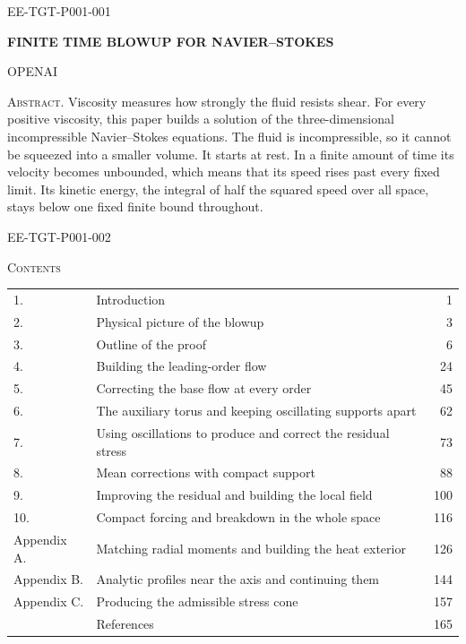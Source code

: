 %
\begin{EESegment}{EE-TGT-P001-001}
\begin{center}
  {\Large\bfseries FINITE TIME BLOWUP FOR NAVIER--STOKES\par}
  \vspace{2.5em}
  {\large OPENAI\par}
\end{center}

\vspace{2em}
\noindent\textsc{Abstract.} Viscosity measures how strongly the fluid resists shear. For every
positive viscosity, this paper builds a solution of the three-dimensional incompressible
Navier--Stokes equations. The fluid is incompressible, so
it cannot be squeezed into a smaller volume. It starts at rest. In a finite amount of time its
velocity becomes unbounded, which means that its speed rises past every fixed limit. Its kinetic
energy, the integral of half the squared speed over all space, stays below one fixed finite bound
throughout.
\end{EESegment}

\vspace{3em}
\begin{EESegment}{EE-TGT-P001-002}
\begin{center}
  {\large\textsc{Contents}}
\end{center}
\begin{tabular*}{\textwidth}{@{\extracolsep{\fill}}llr}
1. & Introduction & 1\\
2. & Physical picture of the blowup & 3\\
3. & Outline of the proof & 6\\
4. & Building the leading-order flow & 24\\
5. & Correcting the base flow at every order & 45\\
6. & The auxiliary torus and keeping oscillating supports apart & 62\\
7. & Using oscillations to produce and correct the residual stress & 73\\
8. & Mean corrections with compact support & 88\\
9. & Improving the residual and building the local field & 100\\
10. & Compact forcing and breakdown in the whole space & 116\\
Appendix A. & Matching radial moments and building the heat exterior & 126\\
Appendix B. & Analytic profiles near the axis and continuing them & 144\\
Appendix C. & Producing the admissible stress cone & 157\\
& References & 165
\end{tabular*}
\end{EESegment}

